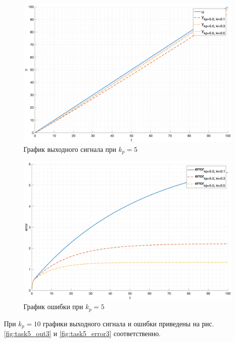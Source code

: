 \begin{figure}[ht!]
    \centering
    \includegraphics[width=\textwidth]{media/plots/task5_out_kp_5.0_1.png}
    \caption{График выходного сигнала при $k_p = 5$}
    \label{fig:task5_out2}
\end{figure}

\begin{figure}[ht!]
    \centering
    \includegraphics[width=\textwidth]{media/plots/task5_error_kp_5.0_1.png}
    \caption{График ошибки при $k_p = 5$}
    \label{fig:task5_error2}
\end{figure}

При $k_p = 10$ графики выходного сигнала и ошибки приведены
на рис. \ref{fig:task5_out3} и \ref{fig:task5_error3} соответственно.

